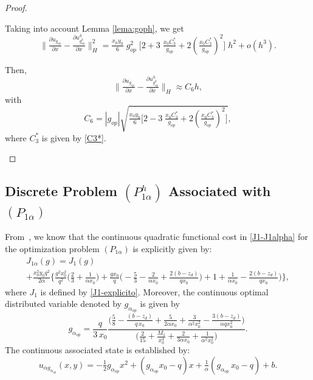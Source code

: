 \documentclass[11pt]{article}
\newcommand\pder[2][]{\ensuremath{\tfrac{\partial#1}{\partial#2}}}
\begin{document}
\begin{proof}
\begin{itemize}
        
        
     \noindent Taking into account Lemma \ref{lema:goph}, we get
     \[ \Big\lVert\pder[ u_{g_{op}}]{x}- \pder[{ u^h_{g^h_{op}}}]{x}    \Big\rVert  _H^2  =  \tfrac{x_0 y_0}{6} \;g_{op}^2\;  \Big[ 2 +3\;\tfrac{x_0 C_3^*}{g_{op}}+2 \left(\tfrac{x_0 C_3^*}{g_{op}}\right)^2 \Big] \; h^2+o(h^3).\]

     \noindent Then, $$ \Big\lVert\pder[ u_{g_{op}}]{x}- \pder[{ u^h_{g^h_{op}}}]{x}    \Big\rVert  _H \approx C_6 h,$$ with 
     $$C_6 = |g_{op}|\sqrt{ \tfrac{x_0 y_0}{6}   \Big[ 2 -3\;\tfrac{x_0 C_3^*}{g_{op}}+2 \left(\tfrac{x_0 C_3^*}{g_{op}}\right)^2 \Big] },$$
      where $C_3^*$ is given by \eqref{C3*}. %
    
     
     
     \end{itemize} \end{proof}

\subsection{Discrete Problem  ${(P^h_{1\alpha})}$ Associated with $(P_{1\alpha})$}

From~\cite{BoGaTa2020}, we know that  the continuous quadratic functional cost in \eqref{J1-J1alpha} for the optimization problem $(P_{1\alpha})$ is explicitly given by: 
      \begin{equation}\label{J1alpha-explicito}
      \begin{array}{ll}
          J_{1\alpha}(g)= J_1(g) \\
          + \tfrac{x_0^2 y_0 q^2}{2\alpha} \Bigg\{\tfrac{g^2 x_0^2}{q^2} \Big(\tfrac{2 }{3} + \tfrac{1}{\alpha x_0} \Big) + 
          \tfrac{g x_0}{q} \Big( - \tfrac{5 }{3} - \tfrac{2}{\alpha x_0} +\tfrac{2 (b-z_d)}{q x_0}\Big) + 1+\tfrac{1}{\alpha x_0}-\tfrac{2(b-z_d)}{qx_0}\Big) \Bigg\},
          \end{array}
      \end{equation}
      where $J_1$ is defined by \eqref{J1-explicito}.
      Moreover, the continuous optimal distributed variable denoted by $g_{\alpha_{op}}$ is {given by}
\begin{equation}\label{galphaop}
          g_{\alpha_{op}} = \frac{q}{3\, x_0} \frac{\Big( \tfrac{5}{8 } -\tfrac{ (b -z_d)}{q \, x_0}+\tfrac{5}{2\alpha x_0}+\tfrac{3}{\alpha^2x_0^2}-\tfrac{3(b-z_d)}{\alpha q x_0^2}\Big)}{\Big(\tfrac{2}{15} + \tfrac{M_1}{x_0^4}+\tfrac{2}{3\alpha x_0}+\tfrac{1}{\alpha^2 x_0^2} \Big)}.
     \end{equation}
\noindent The continuous associated state is established by: 
     \begin{equation}\label{ualpha-galphaop}
            u_{\alpha g_{\alpha_{op}}}(x,y) = -\tfrac{1}{2} g_{\alpha_{op}} x^2 + (g_{\alpha_{op}} x_0 - q) x + \tfrac{1}{\alpha} (g_{\alpha_{op}}\,x_0 - q) +b.
       \end{equation}
       
\end{document}
